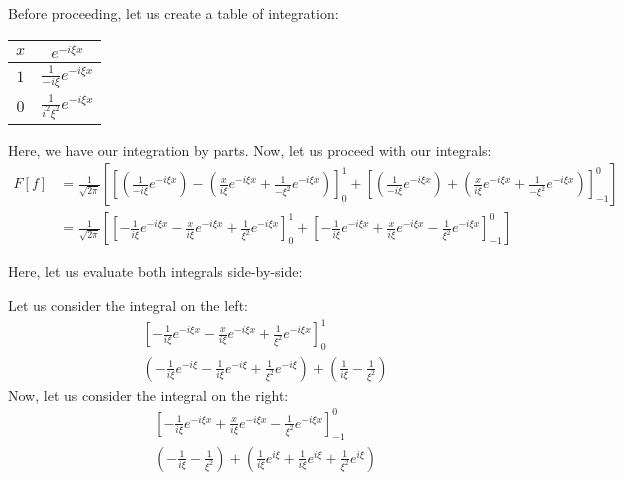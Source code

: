 \begin{enumerate}
Before proceeding, let us create a table of integration:

\begin{center}
  \begin{tabular}{c|c}
    $x$ &  $                    e^{-i \xi x}$\\
    \hline
    $1$ &  $\frac{1}{-i \xi}    e^{-i \xi x}$\\
    \hline
    $0$ &  $\frac{1}{i^2 \xi^2} e^{-i \xi x}$
  \end{tabular}
\end{center}

Here, we have our integration by parts. Now, let us proceed with our integrals:
%
\begin{align}
  F[f]
  & =
  \frac{1}{\sqrt{2 \pi}}
  \left[
    \left[
       \left(\frac{1}{-i \xi} e^{-i \xi x}\right)
     - \left(\frac{x}{ i \xi} e^{-i \xi x} + \frac{1}{-\xi^2} e^{-i \xi x}\right)
    \right]^1_0
  + \left[
      \left(\frac{1}{-i \xi} e^{-i \xi x}\right)
    + \left(\frac{x}{ i \xi} e^{-i \xi x} + \frac{1}{-\xi^2} e^{-i \xi x}\right)
    \right]^0_{-1}
  \right]\\
  & =
  \frac{1}{\sqrt{2 \pi}}
  \left[
    \left[
     - \frac{1}{ i \xi} e^{-i \xi x}
     - \frac{x}{ i \xi} e^{-i \xi x}
     + \frac{1}{ \xi^2} e^{-i \xi x}
    \right]^1_0
  + \left[
    - \frac{1}{ i \xi} e^{-i \xi x}
    + \frac{x}{ i \xi} e^{-i \xi x}
    - \frac{1}{ \xi^2} e^{-i \xi x}
    \right]^0_{-1}
  \right]
\end{align}

Here, let us evaluate both integrals side-by-side:
\newpage
\begin{multicols}{2}
  Let us consider the integral on the left:
\begin{align}
  &
  \left[
    - \frac{1}{ i \xi} e^{-i \xi x}
    - \frac{x}{ i \xi} e^{-i \xi x}
    + \frac{1}{ \xi^2} e^{-i \xi x}
  \right]^1_0\\
  &
  \left(
  - \frac{1}{ i \xi} e^{-i \xi}
  - \frac{1}{ i \xi} e^{-i \xi}
  + \frac{1}{ \xi^2} e^{-i \xi}
  \right)
  +
  \left(
    \frac{1}{ i \xi}
  - \frac{1}{ \xi^2}
  \right)
\end{align}
  Now, let us consider the integral on the right:
\begin{align}
  &
  \left[
  - \frac{1}{ i \xi} e^{-i \xi x}
  + \frac{x}{ i \xi} e^{-i \xi x}
  - \frac{1}{ \xi^2} e^{-i \xi x}
  \right]^0_{-1}\\
  &
  \left(
  - \frac{1}{ i \xi}
  - \frac{1}{ \xi^2}
  \right)
  +
  \left(
    \frac{1}{ i \xi} e^{i \xi}
  + \frac{1}{ i \xi} e^{i \xi}
  + \frac{1}{ \xi^2} e^{i \xi}
  \right)
\end{align}
\end{multicols}


\end{enumerate}
